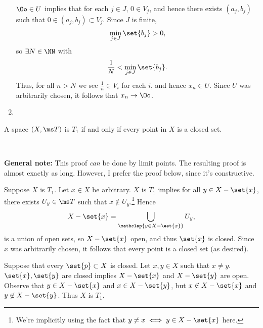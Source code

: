 \documentclass{fkpset}
\newenvironment{why}{\begin{adjustwidth}{0.01\linewidth}{0.05\linewidth}~}%
  {\end{adjustwidth}}
\begin{document}
\begin{solution}
\begin{enumerate}[label=(\arabic*)]
        $\Oo \in U$ implies that for each $j \in J$, $0 \in V_j$, and
        hence there exists $(a_j, b_j)$ such that $0 \in (a_j, b_j)
        \subset V_j$. Since $J$ is finite,
        \[
          \min_{j \in J} \set{b_j} > 0,
        \]
        so $\exists N \in \NN$ with
        \[
          \frac{1}{N} < \min_{j \in J}\set{b_j}.
        \]
        Thus, for all $n > N$ we see $\frac{1}{n} \in V_i$ for each
        $i$, and hence $x_n \in U$. Since $U$ was arbitrarily chosen,
        it follows that $x_n \to \Oo$.
      \item
    \end{enumerate}
  \end{solution}
  \clearpage

  \begin{problem}[5.1]
    A space $(X, \ms T)$ is $T_1$ if and only if every point in $X$ is
    a closed set.
  \end{problem}
  \begin{why}
    \begin{leftbar}
      \textbf{General note:} This proof \emph{can} be done by limit
      points. The resulting proof is almost exactly as long. However,
      I prefer the proof below, since it's constructive.
    \end{leftbar}
  \end{why}
  \begin{solution}
    \begin{iffproof}
      \item Suppose $X$ is $T_1$. Let $x \in X$ be arbitrary. $X$ is
        $T_1$ implies for all $y \in X - \set{x}$, there exists $U_y
        \in \ms T$ such that $x \not \in U_y$.\footnote{We're
          implicitly using the fact that $y \neq x \iff y \in X -
          \set{x}$ here.} Hence
        \[
          X - \set{x} = \bigcup_{\mathclap{y \in X - \set{x}}} U_y,
        \]
        is a union of open sets, so $X - \set{x}$ open, and thus
        $\set{x}$ is closed. Since $x$ was arbitrarily chosen, it
        follows that every point is a closed set (as desired).
      \item Suppose that every $\set{p} \subset X$ is closed. Let $x,y
        \in X$ such that $x \neq y$. $\set{x}, \set{y}$ are closed
        implies $X - \set{x}$ and $X - \set{y}$ are open. Observe that
        $y \in X - \set{x}$ and $x \in X - \set{y}$, but $x \not \in X
        - \set{x}$ and $y \not \in X - \set{y}$. Thus $X$ is $T_1$.
    \end{iffproof}
  \end{solution}
  \clearpage
\end{document}
